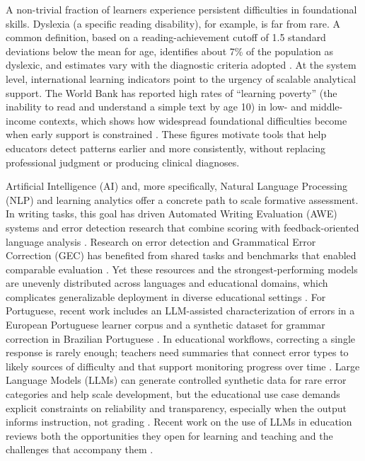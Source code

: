 A non-trivial fraction of learners experience persistent difficulties in foundational skills. Dyslexia (a specific reading disability), for example, is far from rare. A common definition, based on a reading-achievement cutoff of 1.5 standard deviations below the mean for age, identifies about 7\% of the population as dyslexic, and estimates vary with the diagnostic criteria adopted \parencite{PetersonPennington2012}. At the system level, international learning indicators point to the urgency of scalable analytical support. The World Bank has reported high rates of ``learning poverty'' (the inability to read and understand a simple text by age 10) in low- and middle-income contexts, which shows how widespread foundational difficulties become when early support is constrained \parencite{WorldBank2022LearningPoverty}. These figures motivate tools that help educators detect patterns earlier and more consistently, without replacing professional judgment or producing clinical diagnoses.

Artificial Intelligence (AI) and, more specifically, Natural Language Processing (NLP) and learning analytics offer a concrete path to scale formative assessment. In writing tasks, this goal has driven Automated Writing Evaluation (AWE) systems and error detection research that combine scoring with feedback-oriented language analysis \parencite{Bryant2023GECsurvey}. Research on error detection and Grammatical Error Correction (GEC) has benefited from shared tasks and benchmarks that enabled comparable evaluation \parencite{Ng2014,Bryant2019}. Yet these resources and the strongest-performing models are unevenly distributed across languages and educational domains, which complicates generalizable deployment in diverse educational settings \parencite{Joshi2020}. For Portuguese, recent work includes an LLM-assisted characterization of errors in a European Portuguese learner corpus \parencite{Akef2026} and a synthetic dataset for grammar correction in Brazilian Portuguese \parencite{Cabral2026}. In educational workflows, correcting a single response is rarely enough; teachers need summaries that connect error types to likely sources of difficulty and that support monitoring progress over time \parencite{RomeroVentura2024}. Large Language Models (LLMs) can generate controlled synthetic data for rare error categories and help scale development, but the educational use case demands explicit constraints on reliability and transparency, especially when the output informs instruction, not grading \parencite{Brown2020}. Recent work on the use of LLMs in education reviews both the opportunities they open for learning and teaching and the challenges that accompany them \parencite{Kasneci2023}.

